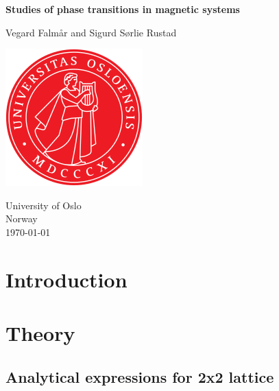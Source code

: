 \documentclass[reprint, english,notitlepage,nofootinbib]{revtex4-1}  %
\begin{document}
\begin{titlepage}
	\begin{center}
	\textbf{Studies of phase transitions in magnetic systems}

	\vspace{0.2cm}
	Vegard Falmår and Sigurd Sørlie Rustad

	\vspace{0.5cm}
	\includegraphics[scale=0.5]{../../pictures/UIO}
	\vspace{0.8cm}

	University of Oslo\\
	Norway\\
	\today	\\
	\end{center}
	\tableofcontents
	\clearpage
\end{titlepage}

\begin{abstract}

\end{abstract}
\maketitle                              %


\section{Introduction}



\section{Theory}

\subsection*{Analytical expressions for 2x2 lattice} \label{sect:2by2Lattice}
\end{document}
